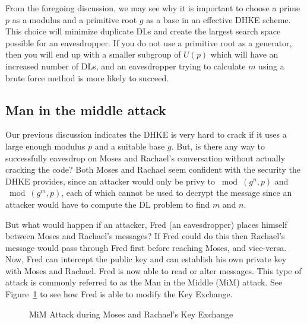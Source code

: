 From the foregoing discussion, we may see why it is important to choose a prime $p$ as a modulus and a primitive root $g$ as a base in an effective DHKE scheme. This choice will minimize duplicate DLs and create the largest search space possible for an eavesdropper.  If you do not use a primitive root as a generator, then you will end up with a smaller subgroup of $U(p)$ which will have an increased number of DLs, and an eavesdropper trying to calculate $m$ using a brute force method is more likely to succeed. 

\subsection{Man in the middle attack}
Our previous discussion indicates the DHKE is very hard to crack if it uses a large enough modulus $p$ and a suitable base $g$. But, is there any way to successfully eavesdrop on Moses and Rachael's conversation without actually cracking the code?  Both Moses and Rachael seem confident with the security the DHKE provides, since an attacker would only be privy to $\bmod (g^n , p)$ and $\bmod (g^m , p)$, each of which cannot be used to decrypt the message since an attacker would have to compute the DL problem to find $m$ and $n$. 

But what would happen if an attacker, Fred (an eavesdropper) places himself between Moses and Rachael's messages?  If Fred could do this then Rachael's message would pass through Fred first before reaching Moses, and vice-versa. Now, Fred can intercept the public key and can establish his own private key with Moses and Rachael.  Fred is now able to read or alter messages.  This type of attack is commonly referred to as the Man in the Middle (MiM) attack.  See Figure~\ref{fig:DH:DHKE_2} to see how Fred is able to modify the Key Exchange.
\begin{figure}[htbp]
	  \caption{\label{fig:DH:DHKE_2} MiM Attack during Moses and Rachael's Key Exchange }
\end{figure}

